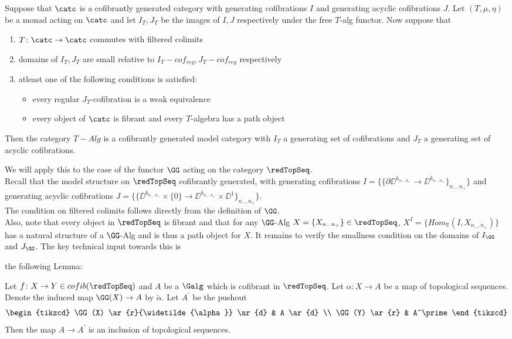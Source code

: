 \documentclass[a4paper,10pt]{amsart}
\begin{document}
\begin{proposition}\label{modprop}
	Suppose that $\catc$ is a cofibrantly generated category with generating cofibrations $I$ and generating acyclic cofibrations $J$. Let $(T,\mu,\eta)$ be a monad acting on $\catc$ and let $I_T, J_T$ be the images of $I,J$ respectively under the free $T$-alg functor. Now suppose that
	\begin{enumerate}
		\item $T \colon \catc \to \catc$ commutes with filtered colimits
		\item domains of $I_T,J_T$ are small relative to $I_T-cof_{reg}, J_T-cof_{reg}$ respectively
		\item atleast one of the following conditions is satisfied: 
			\begin{itemize}
				\item every regular $J_T$-cofibration is a weak equivalence
				\item every object of $\catc$ is fibrant and every $T$-algebra has a path object
			\end{itemize}
	\end{enumerate} 
Then the category $T-Alg$ is a cofibrantly generated model category with $I_T$ a generating set of cofibrations and $J_T$ a generating set of acyclic cofibrations.
\end{proposition}

We will apply this to the case of the functor $\GG$ acting on the category $\redTopSeq$. \\ 
Recall that the model structure on $\redTopSeq$ cofibrantly generated, with generating cofibrations $I=\{\{\partial \DD^{k_{n_-,n_+}} \to \DD^{k_{n_-,n_+}} \}_{n_-,n_+}\}$ and generating acyclic cofibrations $J=\{ \{\DD^{k_{n_-,n_+}}\times \{0\} \to \DD^{k_{n_-,n_+}} \times \DD^1  \}_{n_-,n_+}\}$.\\
 The condition on filtered colimits follows directly from the definition of $\GG$.\\
Also, note that every object in $\redTopSeq$ is fibrant and that for any $\GG$-Alg $X = \{X_{n_-n_+}\} \in \redTopSeq$, $X^I = \{ Hom_{\Top}(I,X_{n_-,n_+}	)\}$ has a natural structure of a $\GG$-Alg and is thus a path object for $X$. It remains to verify the smallness condition on the domains of $I_\GG$ and $J_{\GG}$. The key technical input towards this is 

the following Lemma:

\begin{lemma}\label{lempush}
Let $f \colon X \to Y \in cofib(\redTopSeq)$ and $A$ be a $\Galg$ which is cofibrant in $\redTopSeq$. Let $\alpha \colon X \to A$ be a map of topological sequences. Denote the induced map $\GG(X) \to A$ by $\widetilde{\alpha}$. Let $A^\prime$ be the pushout
\[
	\begin{tikzcd}
	\GG(X) \ar{r}{\widetilde{\alpha}} \ar{d} & A \ar{d} \\
	\GG(Y) \ar{r} & A^\prime
	\end{tikzcd}
\]
Then the map $A \to A^\prime$ is an inclusion of topological sequences.
\end{lemma}
  
\end{document}
